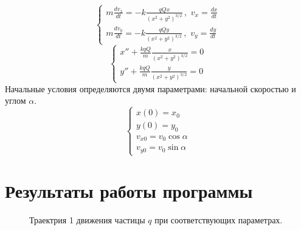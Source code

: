 \documentclass[a5paper, 10pt]{article}
\theoremstyle{definition}
\theoremstyle{plain}
\theoremstyle{remark}
\begin{document}
\begin{equation}
\begin{cases}
m \frac{dv_x}{dt} = -k \frac{qQx}{\left(x^2 + y^2 \right)^{3/2}} \, , \, \, v_x = \frac{dx}{dt}\\
m \frac{dv_y}{dt} = -k \frac{qQy}{\left(x^2 + y^2 \right)^{3/2}} \, , \, \, v_y = \frac{dy}{dt}
\end{cases}
\end{equation}
\begin{equation}
\begin{cases}
 x'' + \frac{k q Q}{m} \frac{x}{\left(x^2 + y^2 \right)^{3/2}} = 0 \\
 y'' + \frac{k q Q}{m} \frac{y}{\left(x^2 + y^2 \right)^{3/2}} = 0
\end{cases}
\end{equation}
\newpage
Начальные условия определяются двумя параметрами: начальной скоростью и углом $\alpha$.\\
\begin{equation}
\begin{cases}
x(0) = x_0\\
y(0) = y_0\\
v_{x0} = v_0 \cos \alpha\\
v_{y0} = v_0 \sin \alpha
\end{cases}
\end{equation}

\newpage
\section{Результаты работы программы}

\begin{figure}[h!]
\caption{Траектрия 1 движения частицы $q$ при соответствующих параметрах.}
\end{figure}
\end{document}
